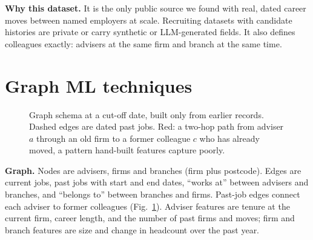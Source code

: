 \documentclass{article}
\begin{document}
\textbf{Why this dataset.} It is the only public source we found with real, dated career moves between named employers at scale. Recruiting datasets with candidate histories are private or carry synthetic or LLM-generated fields. It also defines colleagues exactly: advisers at the same firm and branch at the same time.

\section{Graph ML techniques}

\begin{figure}[t]
  \centering
  \caption{Graph schema at a cut-off date, built only from earlier records. Dashed edges are dated past jobs. Red: a two-hop path from adviser $a$ through an old firm to a former colleague $c$ who has already moved, a pattern hand-built features capture poorly.}
  \label{fig:schema}
\end{figure}

\textbf{Graph.} Nodes are advisers, firms and branches (firm plus postcode). Edges are current jobs, past jobs with start and end dates, ``works at'' between advisers and branches, and ``belongs to'' between branches and firms. Past-job edges connect each adviser to former colleagues (Fig.~\ref{fig:schema}). Adviser features are tenure at the current firm, career length, and the number of past firms and moves; firm and branch features are size and change in headcount over the past year.
\end{document}

